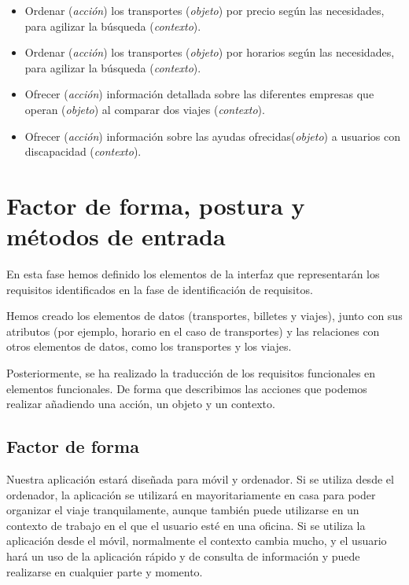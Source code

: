 \begin{itemize}
    \item Ordenar (\textit{acción}) los transportes (\textit{objeto}) por precio según las necesidades, para agilizar la búsqueda (\textit{contexto}).
    \item Ordenar (\textit{acción}) los transportes (\textit{objeto}) por horarios según las necesidades, para agilizar la búsqueda (\textit{contexto}).
    \item Ofrecer (\textit{acción}) información detallada sobre las diferentes empresas que operan (\textit{objeto}) al comparar dos viajes (\textit{contexto}).
    \item Ofrecer (\textit{acción}) información sobre las ayudas ofrecidas(\textit{objeto}) a usuarios con discapacidad (\textit{contexto}).
\end{itemize}

\section{Factor de forma, postura y métodos de entrada}

En esta fase hemos definido los elementos de la interfaz que representarán los requisitos identificados en la fase de identificación de requisitos.

Hemos creado los elementos de datos (transportes, billetes y viajes), junto con sus atributos (por ejemplo, horario en el caso de transportes) y las relaciones con otros elementos de datos, como los transportes y los viajes.

Posteriormente, se ha realizado la traducción de los requisitos funcionales en elementos funcionales. De forma que describimos las acciones que podemos realizar añadiendo una acción, un objeto y un contexto.

\subsection{Factor de forma}
Nuestra aplicación estará diseñada para móvil y ordenador. Si se utiliza desde el ordenador, la aplicación se utilizará en mayoritariamente en casa para 
poder organizar el viaje  tranquilamente, aunque también puede utilizarse en un contexto de trabajo en el que el usuario esté en una oficina. Si se utiliza 
la aplicación desde el móvil, normalmente el contexto cambia mucho, y el usuario hará un uso de la aplicación rápido y de consulta de información y puede 
realizarse en cualquier parte y momento.

